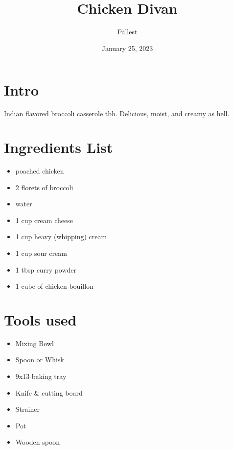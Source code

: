\documentclass{article}
\title{\textbf{Chicken Divan}}
\author{Fullest}
\date{January 25, 2023}
\begin{document}
\maketitle
\thispagestyle{empty}

\begin{multicols}{2}

\section{Intro}
Indian flavored broccoli casserole tbh. Delicious, moist, and creamy as hell.

\section{Ingredients List}
\begin{itemize}
	\item poached chicken
	\item 2 florets of broccoli
	\item water
	\item 1 cup cream cheese
	\item 1 cup heavy (whipping) cream
	\item 1 cup sour cream
	\item 1 tbsp curry powder
	\item 1 cube of chicken bouillon
\end{itemize}

\section{Tools used}
\begin{itemize}
	\item Mixing Bowl
	\item Spoon or Whisk
	\item 9x13 baking tray
	\item Knife \& cutting board
	\item Strainer
	\item Pot
	\item Wooden spoon
\end{itemize}


\end{multicols}
\end{document}
